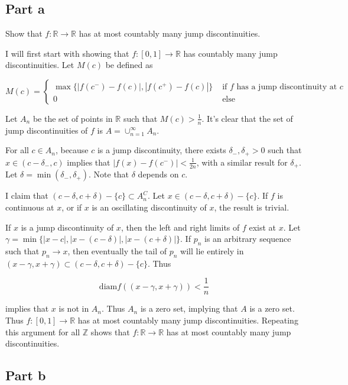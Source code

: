 \documentclass{article}
\newcommand{\R}{\mathbb{R}}
\newcommand{\Z}{\mathbb{Z}}
\newcommand{\diam}{\text{diam}}
\begin{document}
\subsection*{Part a}

Show that $f: \R \rightarrow \R$ has at most countably many jump discontinuities.

I will first start with showing that $f: [0, 1] \rightarrow \R$ has countably many jump discontinuities. Let $M(c)$ be defined as

\[
M(c) =
\begin{cases}
\max\{ |f(c^-) - f(c)|, |f(c^+) - f(c)|\} & \text{ if } f \text{ has a jump discontinuity at } c \\
0 & \text{ else}
\end{cases}
\]

Let $A_n$ be the set of points in $\R$ such that $M(c) > \frac{1}{n}$. It's clear that the set of jump discontinuities of $f$ is $A = \cup_{n=1}^\infty A_n$.

For all $c \in A_n$, because $c$ is a jump discontinuity, there exists $\delta_-, \delta_+ > 0$ such that $x \in (c-\delta_-, c)$ implies that $|f(x) - f(c^-)| < \frac{1}{2n}$, with a similar result for $\delta_+$. Let $\delta = \min (\delta_-, \delta_+)$. Note that $\delta$ depends on $c$.

I claim that $(c - \delta, c + \delta) - \{c\} \subset A_n^C$. Let $x \in (c - \delta, c + \delta) - \{c\}$. If $f$ is continuous at $x$, or if $x$ is an oscillating discontinuity of $x$, the result is trivial.

If $x$ is a jump discontinuity of $x$, then the left and right limits of $f$ exist at $x$. Let $\gamma = \min\{|x-c|, |x - (c-\delta)|, |x-(c+\delta)| \}$. If $p_n$ is an arbitrary sequence such that $p_n \rightarrow x$, then eventually the tail of $p_n$ will lie entirely in $(x-\gamma, x+\gamma) \subset (c - \delta, c + \delta) - \{c\}$. Thus

\[
\diam f((x - \gamma, x + \gamma)) < \frac{1}{n}
\]

implies that $x$ is not in $A_n$. Thus $A_n$ is a zero set, implying that $A$ is a zero set. Thus $f:[0, 1] \rightarrow \R$ has at most countably many jump discontinuities. Repeating this argument for all $\Z$ shows that $f:\R \rightarrow \R$ has at most countably many jump discontinuities.

\subsection*{Part b}
\end{document}
